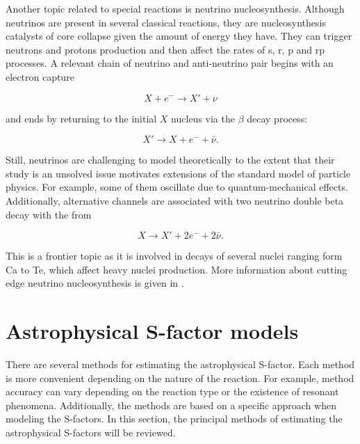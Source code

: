 \documentclass[openany]{book}
\begin{document}
Another topic related to special reactions is neutrino nucleosynthesis. Although neutrinos are present in several classical reactions, they are nucleosynthesis catalysts of core collapse given the amount of energy they have. They can trigger neutrons and protons production and then affect the rates of s, r, p and rp processes.  A relevant chain of neutrino and anti-neutrino pair begins with an electron capture

\begin{equation}\label{eq:reaction_neutrino}
	X + e^{-}\rightarrow X' + \nu 
\end{equation}

and ends by returning to the initial $X$ nucleus via the $\beta$ decay process: 

\begin{equation}\label{eq:reaction_neutrino_2}
	X' \rightarrow X + e^{-} + \bar \nu.
\end{equation}

Still, neutrinos are challenging to model theoretically to the extent that their study is an unsolved issue motivates extensions of the standard model of particle physics. For example, some of them oscillate due to quantum-mechanical effects. Additionally, alternative channels are associated with  two neutrino double beta decay with the from

\begin{equation}\label{eq:reaction_neutrino_doubleBeta}
	X \rightarrow X' + 2e^{-} + 2\bar \nu.
\end{equation}

This is a frontier topic as it is involved in decays of several nuclei ranging form Ca to Te, which affect heavy nuclei production. More information about cutting edge neutrino nucleosynthesis is given in \cite{bertulani_kajino_2016}. \\

\chapter{Astrophysical S-factor models} \label{ch:sfactorModels}

There are several methods for estimating the astrophysical S-factor. Each method is more convenient depending on the nature of the reaction. For example, method accuracy can vary depending on  the reaction type or the existence of resonant phenomena. Additionally, the methods are based on a specific approach when modeling the S-factors. In this section, the principal methods of estimating the astrophysical S-factors will be reviewed.
\end{document}
